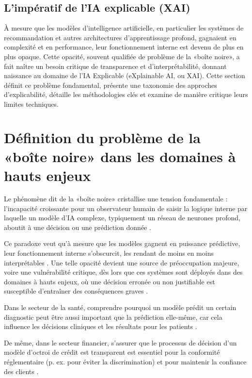 \subsection{L'impératif de l'IA explicable (XAI)}
À mesure que les modèles d'intelligence artificielle, en particulier les systèmes de recommandation et autres architectures d'apprentissage profond, gagnaient en complexité et en performance, leur fonctionnement interne est devenu de plus en plus opaque. Cette opacité, souvent qualifiée de problème de la «boîte noire», a fait naître un besoin critique de transparence et d'interprétabilité, donnant naissance au domaine de l'IA Explicable (eXplainable AI, ou XAI). Cette section définit ce problème fondamental, présente une taxonomie des approches d'explicabilité, détaille les méthodologies clés et examine de manière critique leurs limites techniques.
\section{Définition du problème de la «boîte noire» dans les domaines à hauts enjeux}
Le phénomène dit de la «boîte noire» cristallise une tension fondamentale : l'incapacité croissante pour un observateur humain de saisir la logique interne par laquelle un modèle d'IA complexe, typiquement un réseau de neurones profond, aboutit à une décision ou une prédiction donnée \citep{Sankarapu2022A, Zhao2024Explainable}. 

Ce paradoxe veut qu'à mesure que les modèles gagnent en puissance prédictive, leur fonctionnement interne s'obscurcit, les rendant de moins en moins interprétables \citep{Sankarapu2022A}. Une telle opacité devient une source de préoccupation majeure, voire une vulnérabilité critique, dès lors que ces systèmes sont déployés dans des domaines à hauts enjeux, où une décision erronée ou non justifiable est susceptible d'entraîner des conséquences graves \citep{Sankarapu2022A, Meske2025Explainable}.

Dans le secteur de la santé, comprendre pourquoi un modèle prédit un certain diagnostic peut être aussi important que la prédiction elle-même, car cela influence les décisions cliniques et les résultats pour les patients \citep{Sankarapu2022A}. 

De même, dans le secteur financier, s'assurer que le processus de décision d'un modèle d'octroi de crédit est transparent est essentiel pour la conformité réglementaire (p. ex. pour éviter la discrimination) et pour maintenir la confiance des clients \citep{Sankarapu2022A, Grynbaum2022Explainable}.

